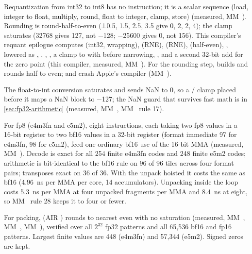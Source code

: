 Requantization from int32 to int8 has no instruction; it is a scalar sequence (load, integer to float, multiply,
round, float to integer, clamp, store) (measured, MM~). Rounding is round-half-to-even (±0.5, 1.5, 2.5, 3.5 give
0, 2, 2, 4); the clamp saturates (32768 gives 127, not −128; −25600 gives 0, not 156). This compiler's requant
epilogue computes  (int32, wrapping),  (RNE),  (RNE),
 (half-even), , lowered as , , , , a clamp to \code{[lo-zp, hi-zp]} with  before narrowing, , and a second 32-bit add for the zero point
(this compiler, measured, MM~). For the rounding step,  builds and rounds half to even;
 and  crash Apple's compiler (MM~).

The float-to-int conversion saturates and sends NaN to 0, so a / clamp placed before it maps
a NaN block to −127; the NaN guard that survives fast math is in \cref{sec:fp32-arithmetic} (measured, MM~,
MM~ rule 17).

For fp8 (e4m3fn and e5m2), eight  instructions, each
taking two fp8 values in a 16-bit register to two bf16 values in a 32-bit register (format immediate 97 for e4m3fn, 98
for e5m2), feed one ordinary bf16 use of the 16-bit MMA (measured, MM~). Decode is exact for all 254 finite e4m3fn codes and 248
finite e5m2 codes; arithmetic is bit-identical to the bf16 rule on 96 of 96 tiles across four format pairs;
transposes exact on 36 of 36. With the unpack hoisted it costs the same as bf16 (4.96~ns per MMA per core, 14
accumulators). Unpacking inside the loop costs 5.3~ns per MMA at four unpacked fragments per MMA and 8.4~ns at eight,
so MM~ rule 28 keeps it to four or fewer.

For packing,  (AIR ) rounds to nearest even with no
saturation (measured, MM~, MM~, MM~), verified over all $2^{32}$ fp32 patterns and all 65,536
bf16 and fp16 patterns. Largest finite values are 448 (e4m3fn) and 57,344 (e5m2). Signed zeros are kept.

